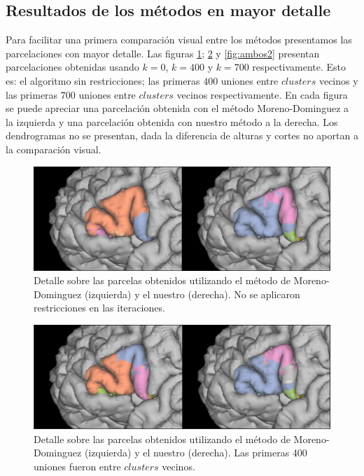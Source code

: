 \subsection{Resultados de los m\'etodos en mayor detalle}
\label{sec:acercamiento}

Para facilitar una primera comparaci\'on visual entre los m\'etodos 
presentamos las parcelaciones con mayor detalle. Las figuras 
\ref{fig:ambos0}; \ref{fig:ambos1} y \ref{fig:ambos2} presentan
parcelaciones obtenidas usando $k=0$, $k=400$ y $k=700$ respectivamente.
Esto es: el algoritmo sin restricciones; las primeras $400$ uniones entre
$clusters$ vecinos y las primeras $700$ uniones entre $clusters$ vecinos
respectivamente.
En cada figura se puede apreciar una parcelaci\'on obtenida con el 
m\'etodo Moreno-Dominguez a la izquierda y una parcelaci\'on obtenida 
con nuestro m\'etodo a la derecha. Los dendrogramas no se presentan, dada
la diferencia de alturas y cortes no aportan a la comparaci\'on visual. \\

\begin{figure}[h!]
    \centering
    \includegraphics[width=\textwidth]{img/broca/vs_0.png}
    \caption{Detalle sobre las parcelas obtenidos utilizando 
             el m\'etodo de Moreno-Dominguez (izquierda) y el nuestro
             (derecha). No se aplicaron restricciones en las iteraciones.}
    \label{fig:ambos0}
\end{figure}

\begin{figure}[h!]
    \centering
    \includegraphics[width=\textwidth]{img/broca/vs_400.png}
    \caption{Detalle sobre las parcelas obtenidos utilizando 
             el m\'etodo de Moreno-Dominguez (izquierda) y el nuestro
             (derecha). Las primeras 400 uniones fueron entre
             $clusters$ vecinos.}
    \label{fig:ambos1}    
\end{figure}
    
